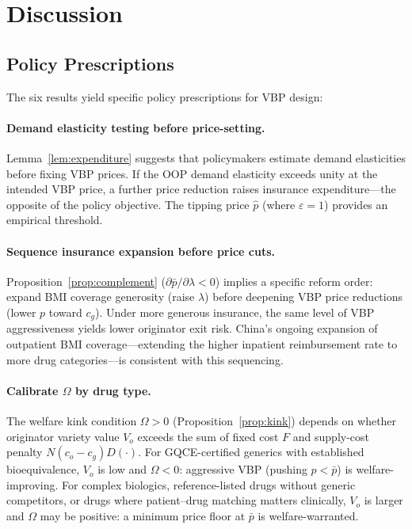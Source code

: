\documentclass[12pt]{article}
\theoremstyle{plain}
\theoremstyle{definition}
\theoremstyle{remark}
\newcommand{\pbar}{\bar{p}}
\newcommand{\1}{\mathbf{1}}
\begin{document}
\section{Discussion}
\label{sec:discussion}

\subsection{Policy Prescriptions}

The six results yield specific policy prescriptions for VBP design:

\paragraph{Demand elasticity testing before price-setting.} Lemma~\ref{lem:expenditure} suggests that policymakers estimate demand elasticities before fixing VBP prices. If the OOP demand elasticity exceeds unity at the intended VBP price, a further price reduction raises insurance expenditure---the opposite of the policy objective. The tipping price $\hat{p}$ (where $\varepsilon = 1$) provides an empirical threshold.

\paragraph{Sequence insurance expansion before price cuts.} Proposition~\ref{prop:complement} ($\partial\pbar/\partial\lambda < 0$) implies a specific reform order: expand BMI coverage generosity (raise $\lambda$) before deepening VBP price reductions (lower $p$ toward $c_g$). Under more generous insurance, the same level of VBP aggressiveness yields lower originator exit risk. China's ongoing expansion of outpatient BMI coverage---extending the higher inpatient reimbursement rate to more drug categories---is consistent with this sequencing.

\paragraph{Calibrate $\Omega$ by drug type.} The welfare kink condition $\Omega > 0$ (Proposition~\ref{prop:kink}) depends on whether originator variety value $V_o$ exceeds the sum of fixed cost $F$ and supply-cost penalty $N(c_o - c_g)D(\cdot)$. For GQCE-certified generics with established bioequivalence, $V_o$ is low and $\Omega < 0$: aggressive VBP (pushing $p < \pbar$) is welfare-improving. For complex biologics, reference-listed drugs without generic competitors, or drugs where patient--drug matching matters clinically, $V_o$ is larger and $\Omega$ may be positive: a minimum price floor at $\pbar$ is welfare-warranted.
\end{document}
